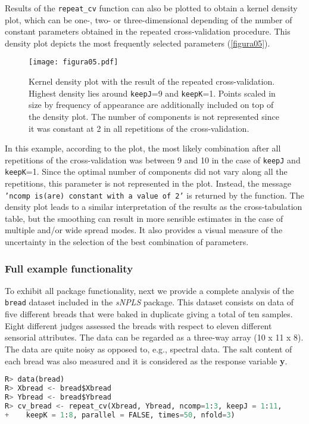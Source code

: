Results of the \texttt{repeat\_cv} function can also be plotted to obtain a kernel density plot, which can be one-, two- or three-dimensional depending of the number of constant parameters obtained in the repeated cross-validation procedure. This density plot depicts the most frequently selected parameters (\autoref{figura05}). 
\vspace{10pt}
\begin{figure}[hbtp]
	\centering
\texttt{[image: figura05.pdf]}
\caption{Kernel density plot with the result of the repeated cross-validation. Highest density lies around \texttt{keepJ}=9 and \texttt{keepK}=1. Points scaled in size by frequency of appearance are additionally included on top of the density plot. The number of components is not represented since it was constant at 2 in all repetitions of the cross-validation.}
\label{figura05}
\end{figure}

In this example, according to the plot, the most likely combination after all repetitions of the cross-validation was between 9 and 10 in the case of \texttt{keepJ} and \texttt{keepK}=1. Since the optimal number of components did not vary along all the repetitions, this parameter is not represented in the plot. Instead, the message \texttt{'ncomp is(are) constant with a value of 2'} is returned by the function. The density plot leads to a similar interpretation of the results as the cross-tabulation table, but the smoothing can result in more sensible estimates in the case of multiple and/or wide spread modes. It also provides a visual measure of the uncertainty in the selection of the best combination of parameters.

\subsubsection{Full example functionality}
To exhibit all package functionality, next we provide a complete analysis of the \texttt{bread} dataset \parencite{bro1998multi} included in the \textit{sNPLS} package. This dataset consists on data of five different breads that were baked in duplicate giving a total of ten samples. Eight different judges assessed the breads with respect to eleven different sensorial attributes. The data can be regarded as a three-way array (10 x 11 x 8). The data are quite noisy as opposed to, e.g., spectral data. The salt content of each bread was also measured and it is considered as the response variable \textbf{y}.
\vspace{15pt}
\begin{lstlisting}[basicstyle=\small, language=Python]
R> data(bread)
R> Xbread <- bread$Xbread
R> Ybread <- bread$Ybread
R> cv_bread <- repeat_cv(Xbread, Ybread, ncomp=1:3, keepJ = 1:11,   
+    keepK = 1:8, parallel = FALSE, times=50, nfold=3)
\end{lstlisting}

